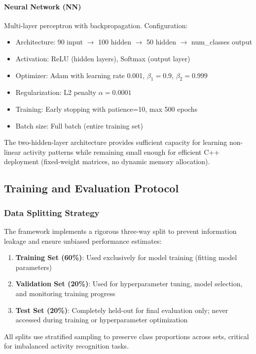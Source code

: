 \paragraph{Neural Network (NN)}
Multi-layer perceptron with backpropagation. Configuration:
\begin{itemize}
    \item Architecture: 90 input $\rightarrow$ 100 hidden $\rightarrow$ 50 hidden $\rightarrow$ num\_classes output
    \item Activation: ReLU (hidden layers), Softmax (output layer)
    \item Optimizer: Adam with learning rate 0.001, $\beta_1=0.9$, $\beta_2=0.999$
    \item Regularization: L2 penalty $\alpha=0.0001$
    \item Training: Early stopping with patience=10, max 500 epochs
    \item Batch size: Full batch (entire training set)
\end{itemize}
The two-hidden-layer architecture provides sufficient capacity for learning non-linear activity patterns while remaining small enough for efficient C++ deployment (fixed-weight matrices, no dynamic memory allocation).

\subsection{Training and Evaluation Protocol}

\subsubsection{Data Splitting Strategy}
The framework implements a rigorous three-way split to prevent information leakage and ensure unbiased performance estimates:
\begin{enumerate}
    \item \textbf{Training Set (60\%)}: Used exclusively for model training (fitting model parameters)
    \item \textbf{Validation Set (20\%)}: Used for hyperparameter tuning, model selection, and monitoring training progress
    \item \textbf{Test Set (20\%)}: Completely held-out for final evaluation only; never accessed during training or hyperparameter optimization
\end{enumerate}

All splits use stratified sampling to preserve class proportions across sets, critical for imbalanced activity recognition tasks.

